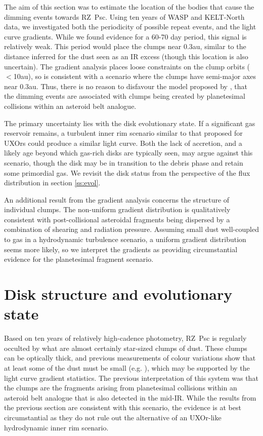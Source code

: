 \documentclass[]{rsos}
\begin{document}
The aim of this section was to estimate the location of the bodies that cause the dimming
events towards RZ~Psc. Using ten years of WASP and KELT-North data, we investigated both the
periodicity of possible repeat events, and the light curve gradients. While we found
evidence for a 60-70 day period, this signal is relatively weak. This period would place
the clumps near 0.3au, similar to the distance inferred for the dust seen as an IR excess
(though this location is also uncertain). The gradient analysis places loose constraints
on the clump orbits ($<$10au), so is consistent with a scenario where the clumps have
semi-major axes near 0.3au. Thus, there is no reason to disfavour the model proposed by
\cite{2013A&A...553L...1D}, that the dimming events are associated with clumps being
created by planetesimal collisions within an asteroid belt analogue.

The primary uncertainty lies with the disk evolutionary state. If a significant gas
reservoir remains, a turbulent inner rim scenario similar to that proposed for UXOrs
could produce a similar light curve. Both the lack of accretion, and a likely age beyond
which gas-rich disks are typically seen, may argue against this scenario, though the disk
may be in transition to the debris phase and retain some primordial gas. We revisit the
disk status from the perspective of the flux distribution in section \ref{ss:evol}.

An additional result from the gradient analysis concerns the structure of individual
clumps. The non-uniform gradient distribution is qualitatively consistent with
post-collisional asteroidal fragments being dispersed by a combination of shearing and
radiation pressure. Assuming small dust well-coupled to gas in a hydrodynamic turbulence
scenario, a uniform gradient distribution seems more likely, so we interpret the
gradients as providing circumstantial evidence for the planetesimal fragment scenario.

\section{Disk structure and evolutionary state}\label{s:disk}

Based on ten years of relatively high-cadence photometry, RZ~Psc is regularly occulted by
what are almost certainly star-sized clumps of dust. These clumps can be optically thick,
and previous measurements of colour variations show that at least some of the dust must
be small (e.g. \cite{2003ARep...47..580S}), which may be supported by the light curve
gradient statistics. The previous interpretation of this system was that the clumps are
the fragments arising from planetesimal collisions within an asteroid belt analogue that
is also detected in the mid-IR. While the results from the previous section are
consistent with this scenario, the evidence is at best circumstantial as they do not rule
out the alternative of an UXOr-like hydrodynamic inner rim scenario.
\end{document}
